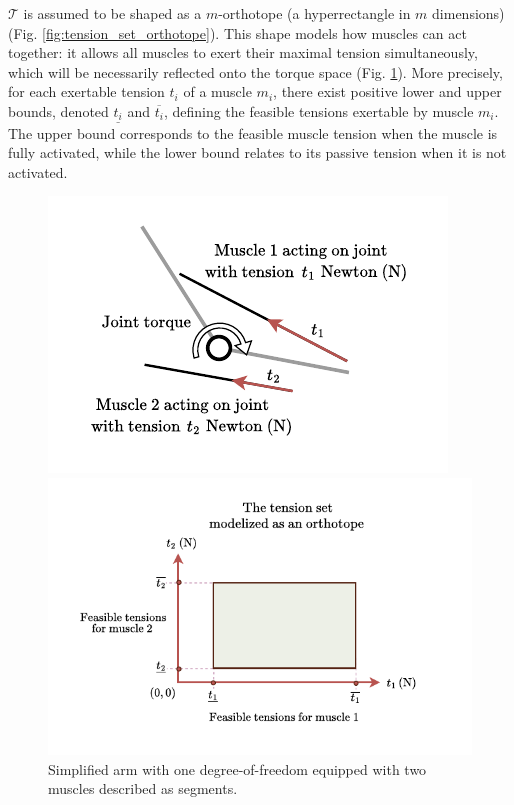 $\mathcal{T}$ is assumed to be shaped as a $m$-orthotope (a hyperrectangle in $m$ dimensions) (Fig. \ref{fig:tension_set_orthotope}). This shape models how muscles can act together: it allows all muscles to exert their maximal tension simultaneously, which will be necessarily reflected onto the torque space (Fig. \ref{fig:joint_torque_simple_2D}). More precisely, for each exertable tension $t_i$ of a muscle $m_i$, there exist positive lower and upper bounds, denoted $\underline{t_i}$ and $\overline{t_i}$, defining the feasible tensions exertable by muscle $m_i$. The upper bound corresponds to the feasible muscle tension when the muscle is fully activated, while the lower bound relates to its passive tension when it is not activated.
\begin{figure}[!htb]
  \begin{minipage}{0.39\linewidth}
    \centering
    \includegraphics[trim={20 0 20 0}, clip, width=1\linewidth]{img/chapter_2/joint_torque_simple_2D.pdf}
    \caption{Simplified arm with one degree-of-freedom equipped with two muscles described as segments.}
    \label{fig:joint_torque_simple_2D}
  \end{minipage}
  \hfill
  \begin{minipage}{0.59\linewidth}
    \centering
    \includegraphics[trim={25 20 40 16}, clip, width=0.92\linewidth]{img/chapter_2/tension_set_orthotope.pdf}

\end{minipage}
\end{figure}
